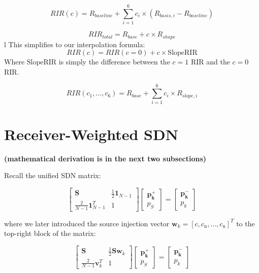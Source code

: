 \documentclass[conference]{IEEEtran}
\begin{document}
$$ RIR(c) = R_{baseline} + \sum_{i=1}^{6} c_i \times (R_{basis, i} - R_{baseline}) $$

$$ RIR_{total} = R_{base} + c \times R_{shape} $$
l
This simplifies to our interpolation formula:
$$ RIR(c) = RIR(c=0) + c \times \text{SlopeRIR} $$
Where $\text{SlopeRIR}$ is simply the difference between the $c=1$ RIR and the $c=0$ RIR.


$$ RIR(c_1, \dots, c_6) = R_{base} + \sum_{i=1}^{6} c_i \times R_{slope, i} $$

\newpage
\section{Receiver-Weighted SDN}
\label{sec:pickup}

\textbf{(mathematical derivation is in the next two subsections)}

Recall the unified SDN matrix:

\begin{equation}
\label{eq:augmented_matrix}
\begin{bmatrix}
    \mathbf{S} & \frac{1}{2}\mathbf{1}_{N-1} \\
    \frac{2}{N-1}\mathbf{1}_{N-1}^T & 1
\end{bmatrix}
\begin{bmatrix}
\mathbf{p_k^+} \\
p_{S}
\end{bmatrix}
=
\begin{bmatrix}
\mathbf{p_k^-} \\
p_k
\end{bmatrix}
\end{equation}

where we later introduced the source injection vector $\mathbf{w}_k= [c, c_{\text{n}}, \ldots ,c_{\text{n}}]^T$ to the top-right block of the matrix:

\begin{equation}
\label{eq:tunable_sdn_matrix}
\begin{bmatrix} 
\mathbf{S} & \frac{1}{2}\mathbf{S}\mathbf{w}_k \\ 
\frac{2}{N-1}\mathbf{v}_k^T & 1 
\end{bmatrix} 
\begin{bmatrix} \mathbf{p_k^+} \\ p_S \end{bmatrix}
= \begin{bmatrix} \mathbf{p_k^-} \\ p_k \end{bmatrix}
\end{equation}
\end{document}
